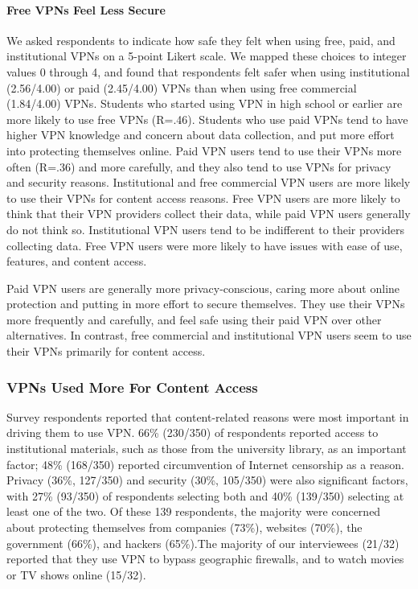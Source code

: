 \paragraph{Free VPNs Feel Less Secure} We asked respondents to indicate how safe they felt when using free, paid, and
institutional VPNs on a 5-point Likert scale. We mapped these choices to
integer values 0 through 4, and found that respondents felt safer when using
institutional (2.56/4.00) or paid (2.45/4.00) VPNs than when using free
commercial (1.84/4.00) VPNs. Students who started using VPN in high school or
earlier are more likely to use free VPNs (R=.46). Students who use paid VPNs
tend to have higher VPN knowledge and concern about data collection, and put
more effort into protecting themselves online. Paid VPN users tend to use
their VPNs more often (R=.36) and more carefully, and they also tend to use
VPNs for privacy and security reasons. Institutional and free commercial VPN
users are more likely to use their VPNs for content access reasons. Free VPN
users are more likely to think that their VPN providers collect their data,
while paid VPN users generally do not think so. Institutional VPN users tend
to be indifferent to their providers collecting data. Free VPN users were more
likely to have issues with ease of use, features, and content access.

Paid VPN users are generally more privacy-conscious, caring more about online
protection and putting in more effort to secure themselves. They use their
VPNs more frequently and carefully, and feel safe using their paid VPN over
other alternatives. In contrast, free commercial and institutional VPN users
seem to use their VPNs primarily for content access.






\subsubsection{VPNs Used More For Content Access}
Survey respondents reported that content-related reasons were most important
in driving them to use VPN. 66\% (230/350) of respondents reported access to
institutional materials, such as those from the university library, as an
important factor; 48\% (168/350) reported circumvention of Internet censorship
as a reason. Privacy (36\%, 127/350) and security (30\%, 105/350) were also
significant factors, with 27\% (93/350) of respondents selecting both and 40\%
(139/350) selecting at least one of the two. Of these 139 respondents, the
majority were concerned about protecting themselves from companies (73\%),
websites (70\%), the government (66\%), and hackers (65\%).The majority of our interviewees (21/32) reported
that they use VPN to bypass geographic firewalls, and to watch movies
or TV shows online (15/32).  


